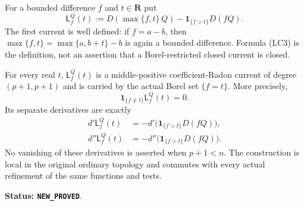 \begin{definition}
\label{def:r11-level-current}
For a bounded difference $f$ and $t\in\mathbf R$ put
\[
 \mathsf L^Q_f(t)
 :=D(\max\{f,t\}\,Q)
                 -\mathbf1_{\{f>t\}}D(fQ).
 \tag{LC3}
\]
The first current is well defined: if $f=a-b$, then
$\max\{f,t\}=\max\{a,b+t\}-b$ is again a bounded
difference.  Formula (LC3) is the definition, not an assertion
that a Borel-restricted closed current is closed.
\end{definition}

\begin{theorem}
\label{thm:r11-positive-level-current}
For every real $t$, $\mathsf L^Q_f(t)$ is a middle-positive
coefficient-Radon current of degree $(p+1,p+1)$ and is carried by
the actual Borel set $\{f=t\}$.  More precisely,
\[
 \mathbf1_{\{f\ne t\}}\mathsf L^Q_f(t)=0.
 \tag{LC4}
\]
Its separate derivatives are exactly
\[
 \begin{split}
 d'\mathsf L^Q_f(t)
       &=-d'\bigl(\mathbf1_{\{f>t\}}D(fQ)\bigr),\\
 d''\mathsf L^Q_f(t)
       &=-d''\bigl(\mathbf1_{\{f>t\}}D(fQ)\bigr).
 \end{split}
 \tag{LC5}
\]
No vanishing of these derivatives is asserted when $p+1<n$.
The construction is local in the original ordinary topology and
commutes with every actual refinement of the same functions and tests.
\end{theorem}

\noindent\textbf{Status: \texttt{NEW\_PROVED}}.

